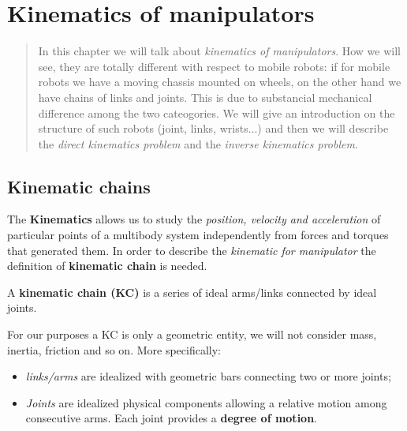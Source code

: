 \chapter{Kinematics of manipulators}
\begin{quotation}
    \noindent\textsf{
        In this chapter we will talk about \textit{kinematics of manipulators}. How we will see, they are totally different with respect to mobile robots: if for mobile robots we have a moving chassis mounted on wheels, on the other hand we have chains of links and joints. This is due to substancial mechanical difference among the two cateogories. We will give an introduction on the structure of such robots (joint, links, wrists...) and then we will describe the \textit{direct kinematics problem} and the \textit{inverse kinematics problem}.
    }
\end{quotation}
\minitoc

\section{Kinematic chains}
The \textbf{Kinematics} allows us to study the \textit{position, velocity and acceleration} of particular points of a multibody system independently from forces and torques that generated them. In order to describe the \textit{kinematic for manipulator} the definition of \textbf{kinematic chain} is needed.
\begin{definition}
    A \textbf{kinematic chain (KC)} is a series of ideal arms/links connected by ideal joints.
\end{definition}
For our purposes a KC is only a geometric entity, we will not consider mass, inertia, friction and so on. More specifically:
\begin{itemize}
    \itemsep-0.3em
    \item \textit{links/arms} are idealized with geometric bars connecting two or more joints; 
    \item \textit{Joints} are idealized physical components allowing a relative motion among consecutive arms. Each joint provides a \textbf{degree of motion}.
\end{itemize}

